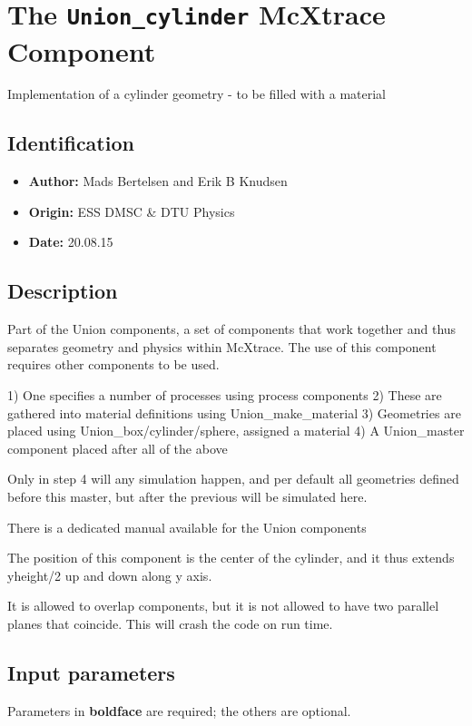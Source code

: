 \section{The \texttt{Union\_cylinder} McXtrace Component}
Implementation of a cylinder geometry - to be filled with a material

\subsection*{Identification}
\begin{itemize}
  \item \textbf{Author:} Mads Bertelsen and Erik B Knudsen
  \item \textbf{Origin:} ESS DMSC \& DTU Physics
  \item \textbf{Date:} 20.08.15
\end{itemize}

\subsection*{Description}
Part of the Union components, a set of components that work together and thus separates geometry and physics within McXtrace. The use of this component requires other components to be used.

1) One specifies a number of processes using process components 2) These are gathered into material definitions using Union\_make\_material 3) Geometries are placed using Union\_box/cylinder/sphere, assigned a material 4) A Union\_master component placed after all of the above

Only in step 4 will any simulation happen, and per default all geometries defined before this master, but after the previous will be simulated here.

There is a dedicated manual available for the Union components

The position of this component is the center of the cylinder, and it thus extends yheight/2 up and down along y axis.

It is allowed to overlap components, but it is not allowed to have two parallel planes that coincide. This will crash the code on run time.

\subsection*{Input parameters}
Parameters in \textbf{boldface} are required; the others are optional.


